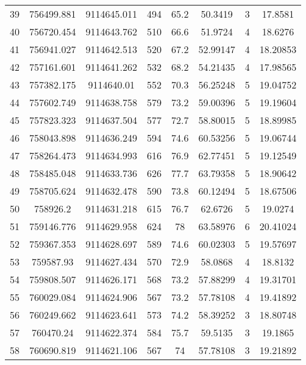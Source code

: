 \begin{longtable}{cccccccc}
39   & 756499.881      & 9114645.011      & 494     & 65.2  & 50.3419  & 3  & 17.8581  \\
40   & 756720.454      & 9114643.762      & 510     & 66.6  & 51.9724  & 4  & 18.6276  \\
41   & 756941.027      & 9114642.513      & 520     & 67.2  & 52.99147 & 4  & 18.20853 \\
42   & 757161.601      & 9114641.262      & 532     & 68.2  & 54.21435 & 4  & 17.98565 \\
43   & 757382.175      & 9114640.01       & 552     & 70.3  & 56.25248 & 5  & 19.04752 \\
44   & 757602.749      & 9114638.758      & 579     & 73.2  & 59.00396 & 5  & 19.19604 \\
45   & 757823.323      & 9114637.504      & 577     & 72.7  & 58.80015 & 5  & 18.89985 \\
46   & 758043.898      & 9114636.249      & 594     & 74.6  & 60.53256 & 5  & 19.06744 \\
47   & 758264.473      & 9114634.993      & 616     & 76.9  & 62.77451 & 5  & 19.12549 \\
48   & 758485.048      & 9114633.736      & 626     & 77.7  & 63.79358 & 5  & 18.90642 \\
49   & 758705.624      & 9114632.478      & 590     & 73.8  & 60.12494 & 5  & 18.67506 \\
50   & 758926.2        & 9114631.218      & 615     & 76.7  & 62.6726  & 5  & 19.0274  \\
51   & 759146.776      & 9114629.958      & 624     & 78    & 63.58976 & 6  & 20.41024 \\
52   & 759367.353      & 9114628.697      & 589     & 74.6  & 60.02303 & 5  & 19.57697 \\
53   & 759587.93       & 9114627.434      & 570     & 72.9  & 58.0868  & 4  & 18.8132  \\
54   & 759808.507      & 9114626.171      & 568     & 73.2  & 57.88299 & 4  & 19.31701 \\
55   & 760029.084      & 9114624.906      & 567     & 73.2  & 57.78108 & 4  & 19.41892 \\
56   & 760249.662      & 9114623.641      & 573     & 74.2  & 58.39252 & 3  & 18.80748 \\
57   & 760470.24       & 9114622.374      & 584     & 75.7  & 59.5135  & 3  & 19.1865  \\
58   & 760690.819      & 9114621.106      & 567     & 74    & 57.78108 & 3  & 19.21892 \\

\end{longtable}
